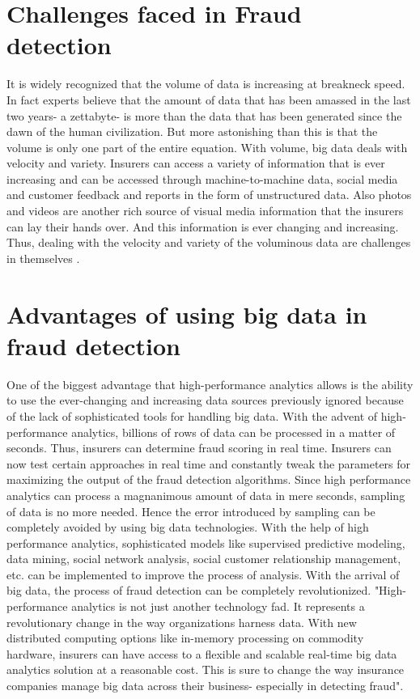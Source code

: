 \documentclass[sigconf]{acmart}
\begin{document}
\section{Challenges faced in Fraud detection}
It is widely recognized that the volume of data is increasing at breakneck speed. In fact experts believe that the amount of data that has been amassed in the last two years- a zettabyte- is more than the data that has been generated since the dawn of the human civilization\cite{link2}. But more astonishing than this is that the volume is only one part of the entire equation. With volume, big data deals with velocity and variety. Insurers can access a variety of information that is ever increasing and can be accessed through machine-to-machine data, social media and customer feedback and reports in the form of unstructured data. Also photos and videos are another rich source of visual media information that the insurers can lay their hands over. And this information is ever changing and increasing. Thus, dealing with the velocity and variety of the voluminous data are challenges in themselves \cite{link3}.

\section{Advantages of using big data in fraud detection}
One of the biggest advantage that high-performance analytics allows is the ability to use the ever-changing and increasing data sources previously ignored because of the lack of sophisticated tools for handling big data. With the advent of high-performance analytics, billions of rows of data can be processed in a matter of seconds. Thus, insurers can determine fraud scoring in real time. Insurers can now test certain approaches in real time and constantly tweak the parameters for maximizing the output of the fraud detection algorithms. Since high performance analytics can process a magnanimous amount of data in mere seconds, sampling of data is no more needed. Hence the error introduced by sampling can be completely avoided by using big data technologies. With the help of high performance analytics, sophisticated models like supervised predictive modeling, data mining, social network analysis, social customer relationship management, etc. can be implemented to improve the process of analysis. With the arrival of big data, the process of fraud detection can be completely revolutionized. 
"High-performance analytics is not just another technology fad. It represents a revolutionary change in the way organizations harness data. With new distributed computing options like in-memory processing on commodity hardware, insurers can have access to a flexible and scalable real-time big data analytics solution at a reasonable cost. This is sure to change the way insurance companies manage big data across their business- especially in detecting fraud"\cite{link3}.
\end{document}

